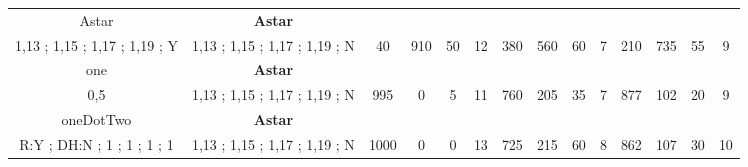 \begin{table}[H]
{\begin{tabular}{|c|c|c|c|c|c|c|c|c|c|c|c|c|c|}
Astar & \cellcolor{blue!15}\textbf{Astar}& {\color[HTML]{00009B} } & {\color[HTML]{9A0000} } & {\color[HTML]{009901} } &  & {\color[HTML]{00009B} } & {\color[HTML]{9A0000} } & {\color[HTML]{009901} } &  & {\color[HTML]{00009B} } & {\color[HTML]{9A0000} } & {\color[HTML]{009901} } &  \\ 
1,13 ; 1,15 ; 1,17 ; 1,19 ; Y & \cellcolor{ blue!15}1,13 ; 1,15 ; 1,17 ; 1,19 ; N & \multirow{-2}{*}{{\color[HTML]{00009B} 40}} & \multirow{-2}{*}{{\color[HTML]{9A0000} 910}} & \multirow{-2}{*}{{\color[HTML]{009901} 50}} & \multirow{-2}{*}{12} & \multirow{-2}{*}{{\color[HTML]{00009B} 380}} & \multirow{-2}{*}{{\color[HTML]{9A0000} 560}} & \multirow{-2}{*}{{\color[HTML]{009901} 60}} & \multirow{-2}{*}{7} & \multirow{-2}{*}{{\color[HTML]{00009B} 210}} & \multirow{-2}{*}{{\color[HTML]{9A0000} 735}} & \multirow{-2}{*}{{\color[HTML]{009901} 55}} & \multirow{-2}{*}{9} \\ \hline

one & \cellcolor{blue!15}\textbf{Astar}& {\color[HTML]{00009B} } & {\color[HTML]{9A0000} } & {\color[HTML]{009901} } &  & {\color[HTML]{00009B} } & {\color[HTML]{9A0000} } & {\color[HTML]{009901} } &  & {\color[HTML]{00009B} } & {\color[HTML]{9A0000} } & {\color[HTML]{009901} } &  \\ 
0,5 & \cellcolor{ blue!15}1,13 ; 1,15 ; 1,17 ; 1,19 ; N & \multirow{-2}{*}{{\color[HTML]{00009B} 995}} & \multirow{-2}{*}{{\color[HTML]{9A0000} 0}} & \multirow{-2}{*}{{\color[HTML]{009901} 5}} & \multirow{-2}{*}{11} & \multirow{-2}{*}{{\color[HTML]{00009B} 760}} & \multirow{-2}{*}{{\color[HTML]{9A0000} 205}} & \multirow{-2}{*}{{\color[HTML]{009901} 35}} & \multirow{-2}{*}{7} & \multirow{-2}{*}{{\color[HTML]{00009B} 877}} & \multirow{-2}{*}{{\color[HTML]{9A0000} 102}} & \multirow{-2}{*}{{\color[HTML]{009901} 20}} & \multirow{-2}{*}{9} \\ \hline

oneDotTwo & \cellcolor{blue!15}\textbf{Astar}& {\color[HTML]{00009B} } & {\color[HTML]{9A0000} } & {\color[HTML]{009901} } &  & {\color[HTML]{00009B} } & {\color[HTML]{9A0000} } & {\color[HTML]{009901} } &  & {\color[HTML]{00009B} } & {\color[HTML]{9A0000} } & {\color[HTML]{009901} } &  \\ 
R:Y ; DH:N ; 1 ; 1 ; 1 ; 1 & \cellcolor{ blue!15}1,13 ; 1,15 ; 1,17 ; 1,19 ; N & \multirow{-2}{*}{{\color[HTML]{00009B} 1000}} & \multirow{-2}{*}{{\color[HTML]{9A0000} 0}} & \multirow{-2}{*}{{\color[HTML]{009901} 0}} & \multirow{-2}{*}{13} & \multirow{-2}{*}{{\color[HTML]{00009B} 725}} & \multirow{-2}{*}{{\color[HTML]{9A0000} 215}} & \multirow{-2}{*}{{\color[HTML]{009901} 60}} & \multirow{-2}{*}{8} & \multirow{-2}{*}{{\color[HTML]{00009B} 862}} & \multirow{-2}{*}{{\color[HTML]{9A0000} 107}} & \multirow{-2}{*}{{\color[HTML]{009901} 30}} & \multirow{-2}{*}{10} \\ \hline


\end{tabular}}
\end{table}

